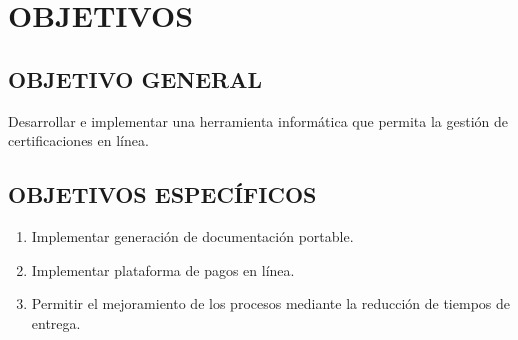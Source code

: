 \chapter{OBJETIVOS}
\section{OBJETIVO GENERAL}
Desarrollar e implementar una herramienta inform\'atica que permita la gesti\'on de certificaciones en l\'inea.
\section{OBJETIVOS ESPEC\'IFICOS}
\begin{enumerate}
	\item Implementar generaci\'on de documentaci\'on portable.%
	\item Implementar plataforma de pagos en l\'inea.%
	\item Permitir el mejoramiento de los procesos mediante la reducci\'on de tiempos de entrega.%
\end{enumerate}